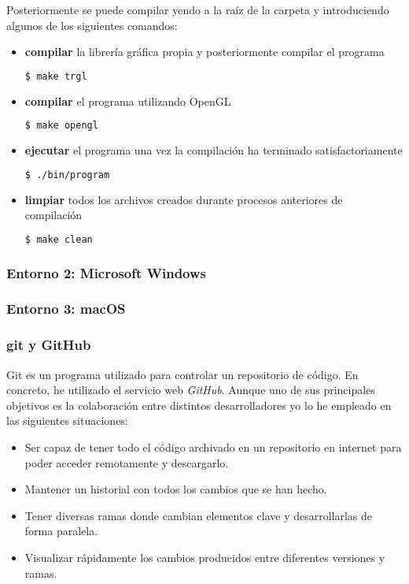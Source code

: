 \documentclass{report}
\begin{document}
\newpage
Posteriormente se puede compilar yendo a la raíz de la carpeta y introduciendo algunos de los siguientes comandos:

\begin{itemize}
\item{\textbf{compilar} la librería gráfica propia y posteriormente compilar el programa}
\begin{lstlisting}[language=bash]
  $ make trgl
\end{lstlisting}
\item{\textbf{compilar} el programa utilizando OpenGL}
\begin{lstlisting}[language=bash]
  $ make opengl
\end{lstlisting}
\item{\textbf{ejecutar} el programa una vez la compilación ha terminado satisfactoriamente}
\begin{lstlisting}[language=bash]
  $ ./bin/program
\end{lstlisting}
\item{\textbf{limpiar} todos los archivos creados durante procesos anteriores de compilación}
\begin{lstlisting}[language=bash]
  $ make clean
\end{lstlisting}
\end{itemize}

\subsubsection{Entorno 2: Microsoft Windows}
\subsubsection{Entorno 3: macOS}
\subsubsection{git y GitHub}
Git es un programa utilizado para controlar un repositorio de código. En concreto, he utilizado el servicio web \textit{GitHub}. Aunque uno de sus principales objetivos es la colaboración entre distintos desarrolladores yo lo he empleado en las siguientes situaciones:
\begin{itemize}
\item{Ser capaz de tener todo el código archivado en un repositorio en internet para poder acceder remotamente y descargarlo.}
\item{Mantener un historial con todos los cambios que se han hecho.}
\item{Tener diversas ramas donde cambian elementos clave y desarrollarlas de forma paralela.}
\item{Visualizar rápidamente los cambios producidos entre diferentes versiones y ramas.}
\end{itemize}
\end{document}
